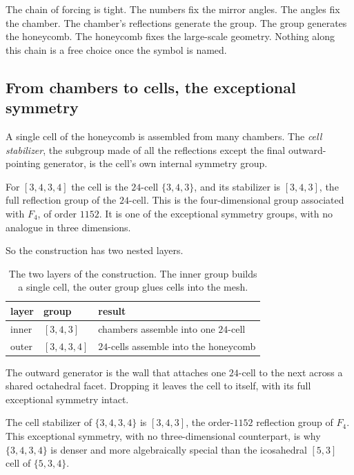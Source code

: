 The chain of forcing is tight. The numbers fix the mirror angles. The angles fix the chamber. The chamber's reflections generate the group. The group generates the honeycomb. The honeycomb fixes the large-scale geometry. Nothing along this chain is a free choice once the symbol is named.

\subsection{From chambers to cells, the exceptional symmetry}

A single cell of the honeycomb is assembled from many chambers. The \emph{cell stabilizer}, the subgroup made of all the reflections except the final outward-pointing generator, is the cell's own internal symmetry group.

For $[3,4,3,4]$ the cell is the $24$-cell $\{3,4,3\}$, and its stabilizer is $[3,4,3]$, the full reflection group of the $24$-cell. This is the four-dimensional group associated with $F_4$, of order $1152$. It is one of the exceptional symmetry groups, with no analogue in three dimensions.

So the construction has two nested layers.

\begin{table}[ht]
\centering
\begin{tabular}{@{}lll@{}}
\toprule
layer & group & result \\
\midrule
inner & $[3,4,3]$ & chambers assemble into one $24$-cell \\
outer & $[3,4,3,4]$ & $24$-cells assemble into the honeycomb \\
\bottomrule
\end{tabular}
\caption{The two layers of the construction. The inner group builds a single cell, the outer group glues cells into the mesh.}
\label{tab:two-layers}
\end{table}

The outward generator is the wall that attaches one $24$-cell to the next across a shared octahedral facet. Dropping it leaves the cell to itself, with its full exceptional symmetry intact.

\begin{result}
The cell stabilizer of $\{3,4,3,4\}$ is $[3,4,3]$, the order-$1152$ reflection group of $F_4$. This exceptional symmetry, with no three-dimensional counterpart, is why $\{3,4,3,4\}$ is denser and more algebraically special than the icosahedral $[5,3]$ cell of $\{5,3,4\}$.
\end{result}


